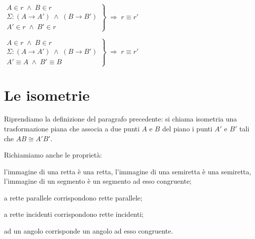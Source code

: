 
\noindent\begin{minipage}{0.6\textwidth}\parindent15pt
\noindent $\left.\begin{array}{lll} A\in r \;\wedge\; B\in r\\ \Sigma : (A\rightarrow A') \;\wedge\; (B\rightarrow B')\\ A'\in r \;\wedge\; B'\in r \end{array}\right\} \;\Rightarrow\; r\equiv r'$
\end{minipage}\hfil
\begin{minipage}{0.4\textwidth}
	\centering
\end{minipage}\vspace{8pt}

\noindent\begin{minipage}{0.6\textwidth}\parindent15pt
\noindent $\left.\begin{array}{lll} A\in r \;\wedge\; B\in r\\ \Sigma : (A\rightarrow A') \;\wedge\; (B\rightarrow B')\\ A'\equiv A \;\wedge\; B'\equiv B \end{array}\right\} \;\Rightarrow\; r\equiv r'$
\end{minipage}\hfil
\begin{minipage}{0.4\textwidth}
	\centering
\end{minipage}


\section{Le isometrie}

Riprendiamo la definizione del paragrafo precedente: si chiama isometria una trasformazione piana che associa a due punti $A$ e $B$ del piano i punti $A'$ e $B'$ tali che $AB\cong A'B'$.

Richiamiamo anche le proprietà:
\begin{itemize*}
\item l'immagine di una retta è una retta, l'immagine di una semiretta è una semiretta, l'immagine di un segmento è un segmento ad esso congruente;
\item a rette parallele corrispondono rette parallele;
\item a rette incidenti corrispondono rette incidenti;
\item ad un angolo corrisponde un angolo ad esso congruente.
\end{itemize*}

